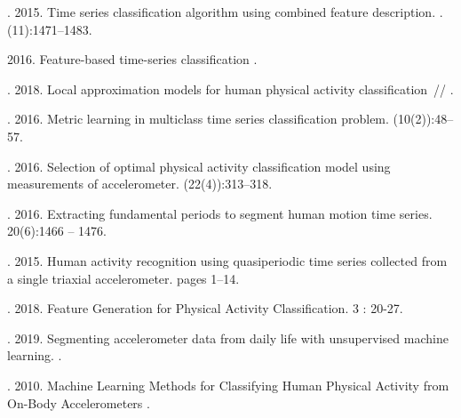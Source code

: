 \documentclass[12pt, twoside]{article}
\begin{document}
\maketitleSecondary
\English
\begin{thebibliography}{99}

	. 2015.
	 Time series classification algorithm using combined feature description. .
	 (11):1471–1483.

	 2016.
	Feature-based time-series classification
	.
	
	. 2018.
	Local approximation models for human physical activity classification~//
	.

	. 2016.
	 Metric learning in multiclass time series classification problem.
	 (10(2)):48–57.

	. 2016.
	 Selection of optimal physical activity classification model using measurements of accelerometer.
	  (22(4)):313–318.

	. 2016.
	 Extracting fundamental periods to segment human motion time series.
	  20(6):1466 – 1476.

	. 2015.
	 Human activity recognition using quasiperiodic time series collected from a single triaxial accelerometer.
	  pages 1–14.
	
	. 2018.
	Feature Generation for Physical Activity Classification.
	  3 : 20-27.

	. 2019.
	 Segmenting accelerometer data from daily life with unsupervised machine learning.
    .
    
    . 2010.
    Machine Learning Methods for Classifying Human Physical Activity from On-Body Accelerometers
    .
    

\end{thebibliography}
\end{document}
